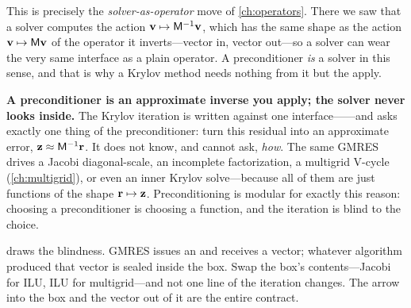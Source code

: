 This is precisely the \emph{solver-as-operator} move of \cref{ch:operators}. There we saw
that a solver computes the action $\mathbf{v}\mapsto\mathsf{M}^{-1}\mathbf{v}$, which has the same shape as
the action $\mathbf{v}\mapsto\mathsf{M}\mathbf{v}$ of the operator it inverts---vector in, vector out---so
a solver can wear the very same  interface as a plain operator. A
preconditioner \emph{is} a solver in this sense, and that is why a Krylov method needs
nothing from it but the apply.

\begin{keyidea}
\textbf{A preconditioner is an approximate inverse you apply; the solver never looks
inside.} The Krylov iteration is written against one interface------and
asks exactly one thing of the preconditioner: turn this residual into an approximate
error, $\mathbf{z}\approx\mathsf{M}^{-1}\mathbf{r}$. It does not know, and cannot ask, \emph{how}. The same
GMRES drives a Jacobi diagonal-scale, an incomplete factorization, a multigrid V-cycle
(\cref{ch:multigrid}), or even an inner Krylov solve---because all of them are just
functions of the shape $\mathbf{r}\mapsto\mathbf{z}$. Preconditioning is modular for exactly this
reason: choosing a preconditioner is choosing a function, and the iteration is blind to
the choice.
\end{keyidea}

 draws the blindness. GMRES issues an  and receives a
vector; whatever algorithm produced that vector is sealed inside the box. Swap the box's
contents---Jacobi for ILU, ILU for multigrid---and not one line of the iteration changes.
The arrow into the box and the vector out of it are the entire contract.

